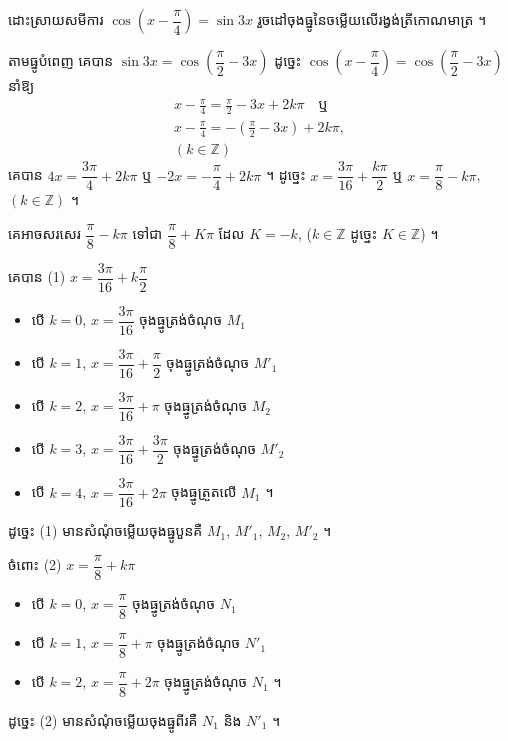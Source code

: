 \begin{example}[លំហាត់គំរូ ១]
ដោះស្រាយសមីការ $\cos\left(x - \dfrac{\pi}{4}\right) = \sin 3x$ រួចដៅចុងធ្នូនៃចម្លើយលើរង្វង់ត្រីកោណមាត្រ ។
\end{example}
\ans
តាមធ្នូបំពេញ គេបាន $\sin 3x = \cos\left(\dfrac{\pi}{2} - 3x\right)$ ដូច្នេះ $\cos\left(x - \dfrac{\pi}{4}\right) = \cos\left(\dfrac{\pi}{2} - 3x\right)$ នាំឱ្យ
\[
\begin{gathered}
x - \frac{\pi}{4} = \frac{\pi}{2} - 3x + 2k\pi \quad \text{ឬ}\\
x - \frac{\pi}{4} = -\left(\frac{\pi}{2} - 3x\right) + 2k\pi,\\
(k \in \mathbb{Z})
\end{gathered}
\]
គេបាន $4x = \dfrac{3\pi}{4} + 2k\pi$ ឬ $-2x = -\dfrac{\pi}{4} + 2k\pi$ ។ ដូច្នេះ $x = \dfrac{3\pi}{16} + \dfrac{k\pi}{2}$ ឬ $x = \dfrac{\pi}{8} - k\pi$, $(k \in \mathbb{Z})$ ។

គេអាចសរសេរ $\dfrac{\pi}{8} - k\pi$ ទៅជា $\dfrac{\pi}{8} + K\pi$ ដែល $K = -k$, ($k \in \mathbb{Z}$ ដូច្នេះ $K \in \mathbb{Z}$) ។

គេបាន (1) $x = \dfrac{3\pi}{16} + k\dfrac{\pi}{2}$
\begin{itemize}
  \item បើ $k = 0$, $x = \dfrac{3\pi}{16}$ ចុងធ្នូត្រង់ចំណុច $M_1$
  \item បើ $k = 1$, $x = \dfrac{3\pi}{16} + \dfrac{\pi}{2}$ ចុងធ្នូត្រង់ចំណុច $M'_1$
  \item បើ $k = 2$, $x = \dfrac{3\pi}{16} + \pi$ ចុងធ្នូត្រង់ចំណុច $M_2$
  \item បើ $k = 3$, $x = \dfrac{3\pi}{16} + \dfrac{3\pi}{2}$ ចុងធ្នូត្រង់ចំណុច $M'_2$
  \item បើ $k = 4$, $x = \dfrac{3\pi}{16} + 2\pi$ ចុងធ្នូត្រួតលើ $M_1$ ។
\end{itemize}
ដូច្នេះ (1) មានសំណុំចម្លើយចុងធ្នូបួនគឺ $M_1$, $M'_1$, $M_2$, $M'_2$ ។

ចំពោះ (2) $x = \dfrac{\pi}{8} + k\pi$
\begin{itemize}
  \item បើ $k = 0$, $x = \dfrac{\pi}{8}$ ចុងធ្នូត្រង់ចំណុច $N_1$
  \item បើ $k = 1$, $x = \dfrac{\pi}{8} + \pi$ ចុងធ្នូត្រង់ចំណុច $N'_1$
  \item បើ $k = 2$, $x = \dfrac{\pi}{8} + 2\pi$ ចុងធ្នូត្រង់ចំណុច $N_1$ ។
\end{itemize}
ដូច្នេះ (2) មានសំណុំចម្លើយចុងធ្នូពីរគឺ $N_1$ និង $N'_1$ ។
\begin{center}
\end{center}

